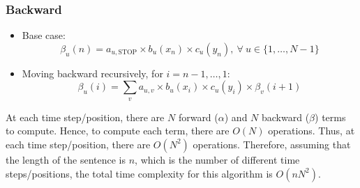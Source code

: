 \documentclass[11pt,fancychapters]{article}
\begin{document}
\subsubsection*{Backward}

\begin{itemize}
	\item Base case:
	\begin{equation*}
		\beta_u(n) = a_{u, \text{STOP}} \times b_u(x_n) \times c_u(y_n), ~ \forall ~ u \in \{ 1, \ldots, N - 1 \}
	\end{equation*}
	
	\item Moving backward recursively, for $i = n - 1, \ldots, 1$:
	\begin{equation*}
		\beta_u(i) = \sum_v a_{u, v} \times b_u(x_i) \times c_u(y_i) \times \beta_v(i + 1)
	\end{equation*}
\end{itemize}

At each time step/position, there are $N$ forward ($\alpha$) and $N$ backward ($\beta$) terms to compute. Hence, to compute each term, there are $O(N)$ operations. Thus, at each time step/position, there are $O(N^2)$ operations. Therefore, assuming that the length of the sentence is $n$, which is the number of different time steps/positions, the total time complexity for this algorithm is $O(nN^2)$.
\end{document}
